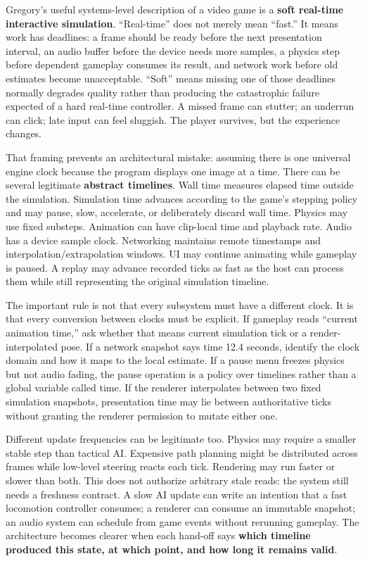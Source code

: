Gregory's useful systems-level description of a video game is a \textbf{soft real-time interactive simulation}. ``Real-time'' does not merely mean ``fast.'' It means work has deadlines: a frame should be ready before the next presentation interval, an audio buffer before the device needs more samples, a physics step before dependent gameplay consumes its result, and network work before old estimates become unacceptable. ``Soft'' means missing one of those deadlines normally degrades quality rather than producing the catastrophic failure expected of a hard real-time controller. A missed frame can stutter; an underrun can click; late input can feel sluggish. The player survives, but the experience changes.

That framing prevents an architectural mistake: assuming there is one universal engine clock because the program displays one image at a time. There can be several legitimate \textbf{abstract timelines}. Wall time measures elapsed time outside the simulation. Simulation time advances according to the game's stepping policy and may pause, slow, accelerate, or deliberately discard wall time. Physics may use fixed substeps. Animation can have clip-local time and playback rate. Audio has a device sample clock. Networking maintains remote timestamps and interpolation/extrapolation windows. UI may continue animating while gameplay is paused. A replay may advance recorded ticks as fast as the host can process them while still representing the original simulation timeline.

The important rule is not that every subsystem must have a different clock. It is that every conversion between clocks must be explicit. If gameplay reads ``current animation time,'' ask whether that means current simulation tick or a render-interpolated pose. If a network snapshot says time 12.4 seconds, identify the clock domain and how it maps to the local estimate. If a pause menu freezes physics but not audio fading, the pause operation is a policy over timelines rather than a global variable called time. If the renderer interpolates between two fixed simulation snapshots, presentation time may lie between authoritative ticks without granting the renderer permission to mutate either one.

Different update frequencies can be legitimate too. Physics may require a smaller stable step than tactical AI. Expensive path planning might be distributed across frames while low-level steering reacts each tick. Rendering may run faster or slower than both. This does not authorize arbitrary stale reads: the system still needs a freshness contract. A slow AI update can write an intention that a fast locomotion controller consumes; a renderer can consume an immutable snapshot; an audio system can schedule from game events without rerunning gameplay. The architecture becomes clearer when each hand-off says \textbf{which timeline produced this state, at which point, and how long it remains valid}.

